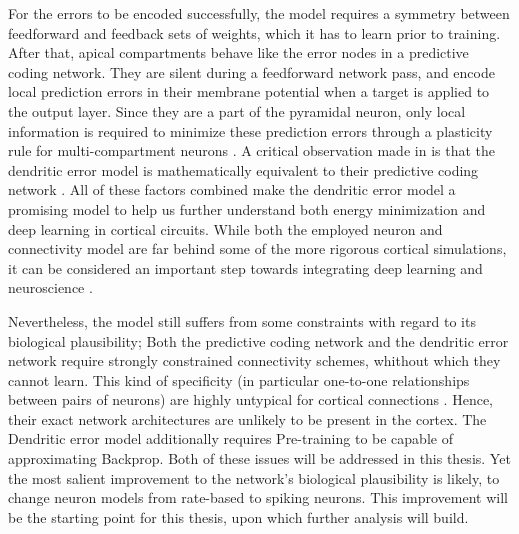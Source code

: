 For the errors to be encoded successfully, the model requires a symmetry between feedforward and feedback sets of
weights, which it has to learn prior to training. After that, apical compartments behave like the error nodes in a
predictive coding network. They are silent during a feedforward network pass, and encode local prediction errors in
their membrane potential when a target is applied to the output layer. Since they are a part of the pyramidal neuron,
only local information is required to minimize these prediction errors through a plasticity rule for multi-compartment
neurons \citep{urbanczik2014learning}. A critical observation made in
\citep{whittington2019theories} is that the dendritic error model is mathematically equivalent to their
predictive coding network . All of these factors combined
make the dendritic error model a promising model to help us further understand both energy minimization and deep
learning in cortical circuits. While both the employed neuron and connectivity model are far behind some of the more
rigorous cortical simulations, it can be considered an important step towards integrating deep learning and neuroscience
\citep{Marblestone2016}.

Nevertheless, the model still suffers from some constraints with regard to its biological plausibility; Both the
predictive coding network and the dendritic error network require strongly constrained connectivity schemes,
whithout which they cannot learn. This kind of specificity (in particular one-to-one relationships between pairs of
neurons) are highly untypical for cortical connections \citep{Thomson2003}. Hence, their exact network architectures are
unlikely to be present in the cortex. The Dendritic error model additionally requires Pre-training to be capable of
approximating Backprop. Both of these issues will be addressed in this thesis. Yet the most salient improvement to the
network's biological plausibility is likely, to change neuron models from rate-based to spiking neurons. This
improvement will be the starting point for this thesis, upon which further analysis will build.

